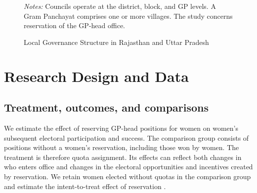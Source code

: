 \documentclass[11pt]{article}
\begin{document}
\begin{figure}[htbp]
    \centering
    
    
    \vspace{\medskipamount}
    
    \caption{Local Governance Structure in Rajasthan and Uttar Pradesh}
    \label{fig:local_govts}
    \vspace{\medskipamount}
    \parbox{0.85\textwidth}{\scriptsize
        \emph{Notes:} Councils operate at the district, block, and GP levels. A Gram Panchayat comprises one or more villages. The study concerns reservation of the GP-head office.
    }
\end{figure}

\FloatBarrier
\section{Research Design and Data}\label{sec:design}

\subsection{Treatment, outcomes, and comparisons}\label{sec:comparisons}\label{sec:duration_design}

We estimate the effect of reserving GP-head positions for women on women's subsequent electoral participation and success. The comparison group consists of positions without a women's reservation, including those won by women. The treatment is therefore quota assignment. Its effects can reflect both changes in who enters office and changes in the electoral opportunities and incentives created by reservation. We retain women elected without quotas in the comparison group and estimate the intent-to-treat effect of reservation \citep{angrist1996identification}.
\end{document}
